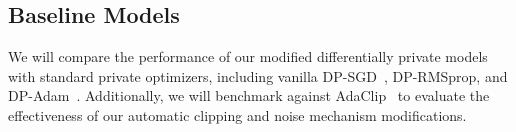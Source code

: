 \subsection{Baseline Models}\label{subsec:baseline-models}
We will compare the performance of our modified differentially private models with standard private optimizers,
including vanilla DP-SGD~\cite{Abadi_2016_DeepLearningDifferentialPrivacy}, DP-RMSprop,
and DP-Adam~\cite{zhou_2020_private_adaptive_algorithms}.
Additionally, we will benchmark against AdaClip~\cite{adaClip_2019} to evaluate the effectiveness of our automatic
clipping and noise mechanism modifications.